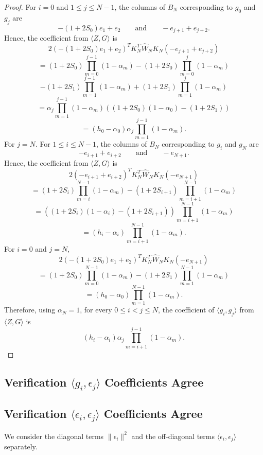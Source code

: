{\begin{proof}
For $i=0$ and $1\le j\le N-1$, the columns of $B_N$ corresponding to
$g_0$ and $g_j$ are
\[-(1+2S_0)e_1+e_2\qquad\text{and}\qquad-e_{j+1}+e_{j+2}.\]
Hence, the coefficient from $\langle Z,G\rangle$ is
\[2(-(1+2S_0)e_1+e_2)^T K_N^T\widehat{W}_NK_N(-e_{j+1}+e_{j+2})\]
\[=(1+2S_0)\prod_{m=0}^{j-1}(1-\alpha_m)-(1+2S_0)\prod_{m=0}^{j}(1-\alpha_m)\]
\[-(1+2S_1)\prod_{m=1}^{j-1}(1-\alpha_m)+(1+2S_1)\prod_{m=1}^{j}(1-\alpha_m)\]
\[=\alpha_j\prod_{m=1}^{j-1}(1-\alpha_m)\left((1+2S_0)(1-\alpha_0)-(1+2S_1)\right)\]
\[=(h_0-\alpha_0)\alpha_j\prod_{m=1}^{j-1}(1-\alpha_m).\]
For $j=N$.
For $1\le i\le N-1$, the columns of $B_N$ corresponding to $g_i$ and $g_N$ are
\[-e_{i+1}+e_{i+2}\qquad\text{and}\qquad-e_{N+1}.\]
Hence, the coefficient from $\langle Z,G\rangle$ is
\[2(-e_{i+1}+e_{i+2})^TK_N^T\widehat{W}_NK_N(-e_{N+1})\]
\[=(1+2S_i)\prod_{m=i}^{N-1}(1-\alpha_m)-(1+2S_{i+1})\prod_{m=i+1}^{N-1}(1-\alpha_m)\]
\[=\left((1+2S_i)(1-\alpha_i)-(1+2S_{i+1})\right)\prod_{m=i+1}^{N-1}(1-\alpha_m)\]
\[=(h_i-\alpha_i)\prod_{m=i+1}^{N-1}(1-\alpha_m).\]
For $i=0$ and $j=N$,
\[2(-(1+2S_0)e_1+e_2)^T K_N^T\widehat{W}_NK_N(-e_{N+1})\]
\[=(1+2S_0)\prod_{m=0}^{N-1}(1-\alpha_m)-(1+2S_1)\prod_{m=1}^{N-1}(1-\alpha_m)\]
\[=(h_0-\alpha_0)\prod_{m=1}^{N-1}(1-\alpha_m).\]
Therefore, using $\alpha_N=1$, for every $0\le i<j\le N$, the coefficient of
$\langle g_i,g_j\rangle$ from $\langle Z,G\rangle$ is
\[(h_i-\alpha_i)\alpha_j\prod_{m=i+1}^{j-1}(1-\alpha_m).\]
\end{proof}

\subsection{Verification $\langle g_i, \epsilon_j\rangle$ Coefficients Agree}


\subsection{Verification $\langle \epsilon_i,\epsilon_j\rangle$ Coefficients Agree}
We consider the diagonal terms $\|\epsilon_i\|^2$ and the off-diagonal terms 
$\langle \epsilon_i,\epsilon_j\rangle$ separately.
}
